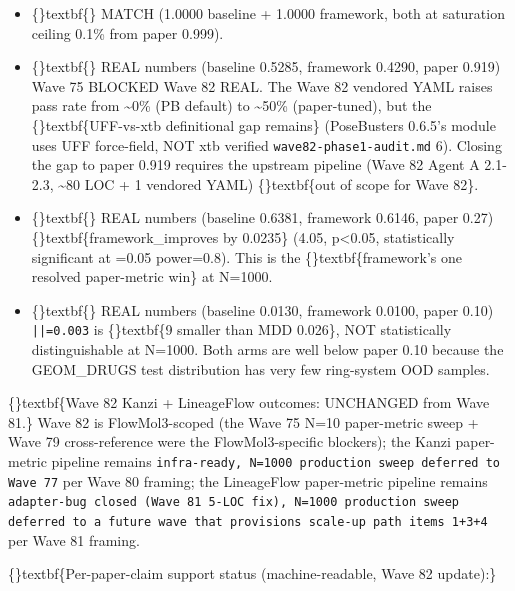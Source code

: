 \documentclass{article}
\begin{document}
\begin{itemize}
\item \{\}textbf\{\} MATCH (1.0000 baseline + 1.0000 framework, both at saturation ceiling 0.1\% from paper 0.999).
\item \{\}textbf\{\} REAL numbers (baseline 0.5285, framework 0.4290, paper 0.919)  Wave 75 BLOCKED  Wave 82 REAL. The Wave 82 vendored YAML raises pass rate from \textasciitilde{}0\% (PB default) to \textasciitilde{}50\% (paper-tuned), but the \{\}textbf\{UFF-vs-xtb definitional gap remains\} (PoseBusters 0.6.5's  module uses UFF force-field, NOT xtb  verified \texttt{wave82-phase1-audit.md} 6). Closing the gap to paper 0.919 requires the upstream  pipeline (Wave 82 Agent A 2.1-2.3, \textasciitilde{}80 LOC + 1 vendored YAML)  \{\}textbf\{out of scope for Wave 82\}.
\item \{\}textbf\{\} REAL numbers (baseline 0.6381, framework 0.6146, paper 0.27)  \{\}textbf\{framework\_improves by 0.0235\} (4.05, p<0.05, statistically significant at =0.05 power=0.8). This is the \{\}textbf\{framework's one resolved paper-metric win\} at N=1000.
\item \{\}textbf\{\} REAL numbers (baseline 0.0130, framework 0.0100, paper 0.10)  \texttt{||=0.003} is \{\}textbf\{9 smaller than MDD 0.026\}, NOT statistically distinguishable at N=1000. Both arms are well below paper 0.10 because the GEOM\_DRUGS test distribution has very few ring-system OOD samples.
\end{itemize}
\{\}textbf\{Wave 82 Kanzi + LineageFlow outcomes: UNCHANGED from Wave 81.\} Wave 82 is FlowMol3-scoped (the Wave 75 N=10 paper-metric sweep + Wave 79 cross-reference were the FlowMol3-specific blockers); the Kanzi paper-metric pipeline remains \texttt{infra-ready, N=1000 production sweep deferred to Wave 77} per Wave 80 framing; the LineageFlow paper-metric pipeline remains \texttt{adapter-bug closed (Wave 81 5-LOC fix), N=1000 production sweep deferred to a future wave that provisions scale-up path items 1+3+4} per Wave 81 framing.

\{\}textbf\{Per-paper-claim support status (machine-readable, Wave 82 update):\}
\end{document}
